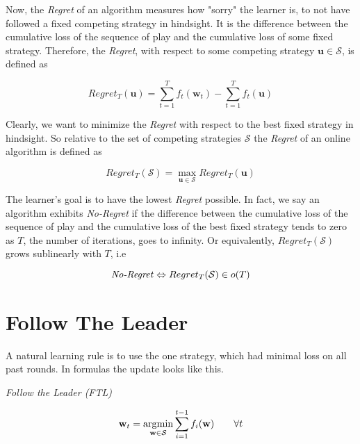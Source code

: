 Now, the \textit{Regret} of an algorithm measures how "sorry" the learner is, to not have followed a fixed competing strategy in hindsight. It is the difference between the cumulative loss of the sequence of play and the cumulative loss of some fixed strategy. Therefore, the \textit{Regret}, with respect to some competing strategy $\textbf{u} \in \mathcal{S}$, is defined as

\begin{equation}\label{noRegretEquation}
    Regret_T(\textbf{u}) = \sum_{t=1}^{T}f_t(\textbf{w}_t) - \sum_{t=1}^{T}f_t(\textbf{u})     
\end{equation}

Clearly, we want to minimize the \textit{Regret} with respect to the best fixed strategy in hindsight. So relative to the set of competing strategies $\mathcal{S}$ the \textit{Regret} of an online algorithm is defined as 

\begin{equation}
    Regret_T(\mathcal{S}) = \max_{\textbf{u} \in \mathcal{S}} Regret_T(\textbf{u})
\end{equation}

The learner's goal is to have the lowest \textit{Regret} possible. In fact, we say an algorithm exhibits \textit{No-Regret} if the difference between the cumulative loss of the sequence of play and the cumulative loss of the best fixed strategy tends to zero as $T$, the number of iterations, goes to infinity. Or equivalently, $Regret_T(\mathcal{S})$ grows sublinearly with $T$, i.e

\begin{equation*}
    \text{\textit{No-Regret}} \Leftrightarrow Regret_T(\mathcal{S}) \in o(T)
\end{equation*}


\section{Follow The Leader}\label{section:followTheLeader}

A natural learning rule is to use the one strategy, which had minimal loss on all past rounds. In formulas the update looks like this.

\begin{center}
    \textit{Follow the Leader (FTL)}  
\end{center}
\begin{equation*}
    \textbf{w}_t = \operatorname*{\arg\!\min}_{\textbf{w} \in \mathcal{S}}\sum_{i=1}^{t-1}f_i(\textbf{w}) \qquad \forall t  
\end{equation*} \\

